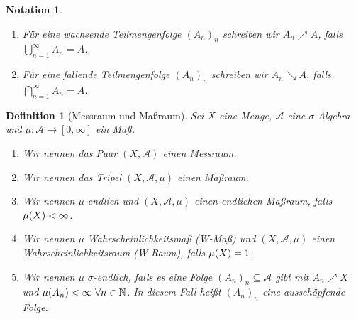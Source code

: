 \documentclass[11pt, twoside, a4paper]{article}
\theoremstyle{plain}
\newtheorem{definition}[blockelement]{Definition}
\newtheorem{notation}[blockelement]{Notation}
\numberwithin{equation}{subsection}
\newcommand{\pair}[1]{\left(#1\right)}
\newcommand{\of}[1]{\mathopen{}\mathclose{}\bgroup\left(#1\aftergroup\egroup\right)}
\newcommand{\interv}[1]{\left[#1\right]}
\newcommand{\theoremescape}{\leavevmode}
\newcommand{\N}{\mathbb{N}}
\newcommand{\mA}{\mathcal{A}}
\begin{document}
    \begin{notation}
        \theoremescape
        \begin{enumerate}
            \item Für eine wachsende Teilmengenfolge $(A_n)_n$ schreiben wir $A_n \nearrow A$, falls $\bigcup_{n=1}^{\infty} A_n = A$.
            \item Für eine fallende Teilmengenfolge $(A_n)_n$ schreiben wir $A_n \searrow A$, falls $\bigcap_{n=1}^{\infty} A_n = A$.
        \end{enumerate}
    \end{notation}

    \begin{definition}[Messraum und Maßraum]
        Sei $X$ eine Menge, $\mA$ eine $\sigma$-Algebra und $\mu: \mA\to\interv{0,\infty}$ ein Maß.
        \begin{enumerate}
            \item Wir nennen das Paar $\pair{X, \mA}$ einen Messraum.
            \item Wir nennen das Tripel $\pair{X, \mA, \mu}$ einen Maßraum.
            \item Wir nennen $\mu$ endlich und $\pair{X, \mA, \mu}$ einen endlichen Maßraum, falls $\mu\of{X} < \infty$.
            \item Wir nennen $\mu$ Wahrscheinlichkeitsmaß (W-Maß) und $\pair{X, \mA, \mu}$ einen Wahrscheinlichkeitsraum (W-Raum), falls $\mu\of{X} = 1$.
            \item Wir nennen $\mu$ $\sigma$-endlich, falls es eine Folge $(A_n)_n \subseteq \mA$ gibt mit $A_n \nearrow X$ und $\mu\of{A_n} < \infty~\forall n\in\N$. In diesem Fall heißt $(A_n)_n$ eine ausschöpfende Folge.
        \end{enumerate}
    \end{definition}
\end{document}
